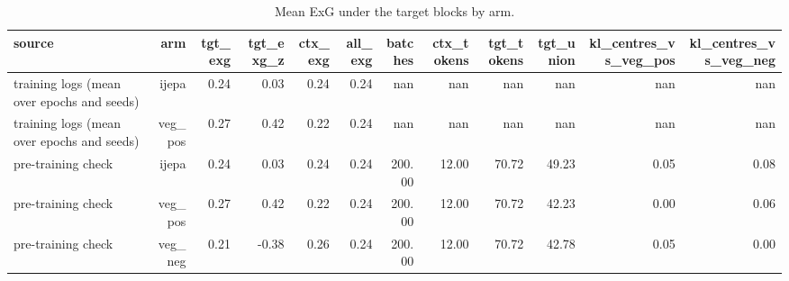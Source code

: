 \begin{table}[t]
\centering
\small
\caption{Mean ExG under the target blocks by arm.}
\label{tab:manipulation_check}
\begin{tabular}{lrrrrrrrrrrr}
\toprule
source & arm & tgt\_exg & tgt\_exg\_z & ctx\_exg & all\_exg & batches & ctx\_tokens & tgt\_tokens & tgt\_union & kl\_centres\_vs\_veg\_pos & kl\_centres\_vs\_veg\_neg \\
\midrule
training logs (mean over epochs and seeds) & ijepa & 0.24 & 0.03 & 0.24 & 0.24 & nan & nan & nan & nan & nan & nan \\
training logs (mean over epochs and seeds) & veg\_pos & 0.27 & 0.42 & 0.22 & 0.24 & nan & nan & nan & nan & nan & nan \\
pre-training check & ijepa & 0.24 & 0.03 & 0.24 & 0.24 & 200.00 & 12.00 & 70.72 & 49.23 & 0.05 & 0.08 \\
pre-training check & veg\_pos & 0.27 & 0.42 & 0.22 & 0.24 & 200.00 & 12.00 & 70.72 & 42.23 & 0.00 & 0.06 \\
pre-training check & veg\_neg & 0.21 & -0.38 & 0.26 & 0.24 & 200.00 & 12.00 & 70.72 & 42.78 & 0.05 & 0.00 \\
\bottomrule
\end{tabular}
\end{table}
